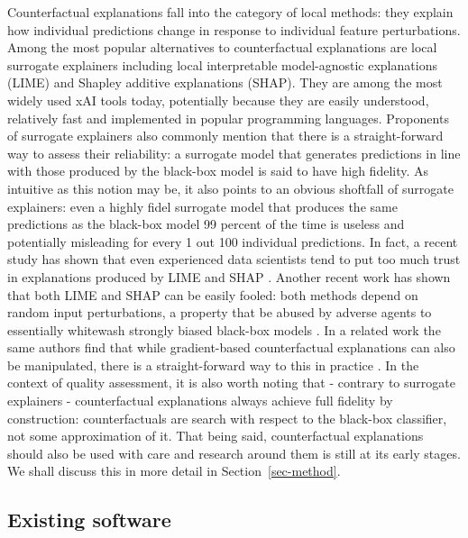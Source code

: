 \documentclass{juliacon}
\begin{document}
Counterfactual explanations fall into the category of local methods:
they explain how individual predictions change in response to individual
feature perturbations. Among the most popular alternatives to
counterfactual explanations are local surrogate explainers including
local interpretable model-agnostic explanations (LIME) and Shapley
additive explanations (SHAP). They are among the most widely used xAI
tools today, potentially because they are easily understood, relatively
fast and implemented in popular programming languages. Proponents of
surrogate explainers also commonly mention that there is a
straight-forward way to assess their reliability: a surrogate model that
generates predictions in line with those produced by the black-box model
is said to have high fidelity. As intuitive as this notion may be, it
also points to an obvious shoftfall of surrogate explainers: even a
highly fidel surrogate model that produces the same predictions as the
black-box model 99 percent of the time is useless and potentially
misleading for every 1 out 100 individual predictions. In fact, a recent
study has shown that even experienced data scientists tend to put too
much trust in explanations produced by LIME and SHAP
\cite{kaur2020interpreting}. Another recent work has shown that both
LIME and SHAP can be easily fooled: both methods depend on random input
perturbations, a property that be abused by adverse agents to
essentially whitewash strongly biased black-box models
\cite{slack2021fooling}. In a related work the same authors find that
while gradient-based counterfactual explanations can also be
manipulated, there is a straight-forward way to this in practice
\cite{slack2021counterfactual}. In the context of quality assessment, it
is also worth noting that - contrary to surrogate explainers -
counterfactual explanations always achieve full fidelity by
construction: counterfactuals are search with respect to the black-box
classifier, not some approximation of it. That being said,
counterfactual explanations should also be used with care and research
around them is still at its early stages. We shall discuss this in more
detail in Section~\ref{sec-method}.

\hypertarget{existing-software}{%
\subsection{Existing software}\label{existing-software}}
\end{document}
